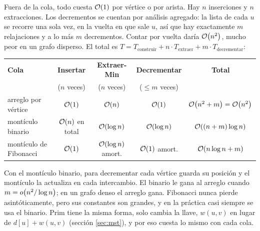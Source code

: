 \documentclass[11pt,letterpaper]{article}
\begin{document}
Fuera de la cola, todo cuesta $\mathcal{O}\!\left(1\right)$ por vértice o por arista. Hay
$n$ inserciones y $n$ extracciones. Los decrementos se cuentan por
análisis agregado: la lista de cada $u$ se recorre una sola vez, en la
vuelta en que sale $u$, así que hay exactamente $m$ relajaciones y a
lo más $m$ decrementos. Contar por vuelta daría $\mathcal{O}\!\left(n^2\right)$, mucho peor
en un grafo disperso. El total es
$T = T_{\text{construir}} + n \cdot T_{\text{extraer}}
+ m \cdot T_{\text{decrementar}}$:
\begin{center}
\small
\begin{tabular}{lcccc}
  \toprule
  \textbf{Cola} & \textbf{Insertar} & \textbf{Extraer-Min}
    & \textbf{Decrementar} & \textbf{Total} \\
  & ($n$ veces) & ($n$ veces) & ($\le m$ veces) & \\
  \midrule
  arreglo por vértice & $\mathcal{O}\!\left(1\right)$ & $\mathcal{O}\!\left(n\right)$ & $\mathcal{O}\!\left(1\right)$
    & $\mathcal{O}\!\left(n^2 + m\right) = \mathcal{O}\!\left(n^2\right)$ \\
  montículo binario & $\mathcal{O}\!\left(n\right)$ en total & $\mathcal{O}\!\left(\log n\right)$
    & $\mathcal{O}\!\left(\log n\right)$ & $\mathcal{O}\!\left((n + m) \log n\right)$ \\
  montículo de Fibonacci & $\mathcal{O}\!\left(1\right)$ & $\mathcal{O}\!\left(\log n\right)$ amort.
    & $\mathcal{O}\!\left(1\right)$ amort. & $\mathcal{O}\!\left(n \log n + m\right)$ \\
  \bottomrule
\end{tabular}
\end{center}
Con el montículo binario, para decrementar cada vértice guarda su
posición y el montículo la actualiza en cada intercambio. El binario
le gana al arreglo cuando $m = o\!\left(n^2 / \log n\right)$; en un grafo denso
el arreglo gana. Fibonacci nunca pierde asintóticamente, pero sus
constantes son grandes, y en la práctica casi siempre se usa el
binario. Prim tiene la misma forma, solo cambia la llave, $w(u, v)$ en
lugar de $d[u] + w(u, v)$ (sección \ref{sec:mst}), y por eso cuesta lo
mismo con cada cola.
\end{document}
